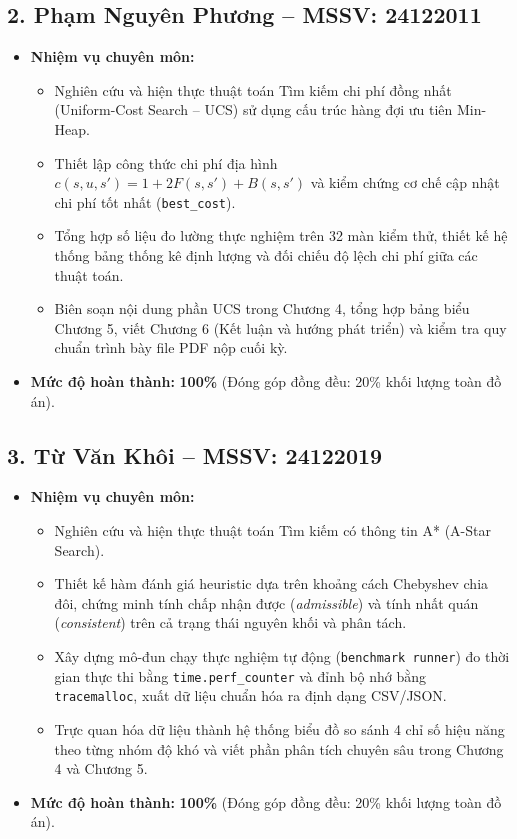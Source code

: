 \subsection*{2. Phạm Nguyên Phương -- MSSV: 24122011}
\begin{itemize}
    \item \textbf{Nhiệm vụ chuyên môn:}
    \begin{itemize}
        \item Nghiên cứu và hiện thực thuật toán Tìm kiếm chi phí đồng nhất (Uniform-Cost Search -- UCS) sử dụng cấu trúc hàng đợi ưu tiên Min-Heap.
        \item Thiết lập công thức chi phí địa hình $c(s, u, s') = 1 + 2F(s,s') + B(s,s')$ và kiểm chứng cơ chế cập nhật chi phí tốt nhất (\texttt{best\_cost}).
        \item Tổng hợp số liệu đo lường thực nghiệm trên 32 màn kiểm thử, thiết kế hệ thống bảng thống kê định lượng và đối chiếu độ lệch chi phí giữa các thuật toán.
        \item Biên soạn nội dung phần UCS trong Chương 4, tổng hợp bảng biểu Chương 5, viết Chương 6 (Kết luận và hướng phát triển) và kiểm tra quy chuẩn trình bày file PDF nộp cuối kỳ.
    \end{itemize}
    \item \textbf{Mức độ hoàn thành:} \textbf{100\%} (Đóng góp đồng đều: 20\% khối lượng toàn đồ án).
\end{itemize}

\subsection*{3. Từ Văn Khôi -- MSSV: 24122019}
\begin{itemize}
    \item \textbf{Nhiệm vụ chuyên môn:}
    \begin{itemize}
        \item Nghiên cứu và hiện thực thuật toán Tìm kiếm có thông tin A* (A-Star Search).
        \item Thiết kế hàm đánh giá heuristic dựa trên khoảng cách Chebyshev chia đôi, chứng minh tính chấp nhận được (\textit{admissible}) và tính nhất quán (\textit{consistent}) trên cả trạng thái nguyên khối và phân tách.
        \item Xây dựng mô-đun chạy thực nghiệm tự động (\texttt{benchmark runner}) đo thời gian thực thi bằng \texttt{time.perf\_counter} và đỉnh bộ nhớ bằng \texttt{tracemalloc}, xuất dữ liệu chuẩn hóa ra định dạng CSV/JSON.
        \item Trực quan hóa dữ liệu thành hệ thống biểu đồ so sánh 4 chỉ số hiệu năng theo từng nhóm độ khó và viết phần phân tích chuyên sâu trong Chương 4 và Chương 5.
    \end{itemize}
    \item \textbf{Mức độ hoàn thành:} \textbf{100\%} (Đóng góp đồng đều: 20\% khối lượng toàn đồ án).
\end{itemize}

